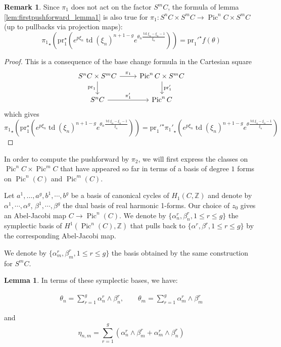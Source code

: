\documentclass{article}
\theoremstyle{definition}
\newcounter{sharedcounter}[section]
\newtheorem{lemma}[sharedcounter]{Lemma}
\newtheorem{remark}[sharedcounter]{Remark}
\DeclareMathOperator{\pic}{\text{Pic}}
\DeclareMathOperator{\td}{td}
\newcommand{\eqtag}[3][1]{
\begin{equation}
   \label{#3}
	\begin{alignedat}{#1}
	#2
	\end{alignedat}
\end{equation}
}
\renewcommand{\leq}{\leqslant}
\begin{document}
\begin{remark}
Since $\pi_1$ does not act on the factor $S^m C$, the formula of lemma \ref{lem:firstpushforward_lemma1} is also true for $\pi_1:S^nC \times S^m C \to \pic^n C \times S^m C$ (up to pullbacks via projection maps):
$${\pi_1}_\star \left( \text{pr}_1^\star \left(e^{p \xi_n}\td(\xi_n)^{n+1-g}  e^{\theta_n \frac{\td \xi_n -\xi_n-1}{\xi_n}} \right)\right)={\text{pr}_1'}^\star f(\theta)$$
\end{remark}

\begin{proof}
This is a consequence of the base change formula in the Cartesian square 
\[
\begin{tikzcd}
S^n C \times S^m C \arrow[r, "\pi_1"] \arrow[d, "\mathrm{pr}_1"'] & \operatorname{Pic}^n C \times S^m C \arrow[d, "\mathrm{pr}'_1"] \\
S^n C \arrow[r, "\pi_1'"] & \operatorname{Pic}^n C
\end{tikzcd}
\]
which gives ${\pi_1}_\star \left( \text{pr}_1^\star \left(e^{p \xi_n}\td(\xi_n)^{n+1-g}  e^{\theta_n \frac{\td \xi_n -\xi_n-1}{\xi_n}} \right)\right)={\text{pr}_1'}^\star {\pi_1'}_\star \left(e^{p \xi_n}\td(\xi_n)^{n+1-g}  e^{\theta \frac{\td \xi_n -\xi_n-1}{\xi_n}} \right)$

\end{proof}





In order to compute the pushforward by $\pi_2$, we will first express the classes on $\pic^{n} C \times \pic^{m}C$ that have appeared so far in terms of a basis of degree $1$ forms on $\pic^n(C)$ and $\pic^m(C)$.


Let $a^1,\dots,a^g, b^1,\cdots,b^g$ be a basis of canonical cycles of $H_1(C,\mathbb{Z})$ and denote by $\alpha^1,\cdots,\alpha^g$, $\beta^1, \cdots,\beta^g$ the dual basis of real harmonic 1-forms.  Our choice of $z_0$ gives an Abel-Jacobi map $C \longrightarrow \pic^{n}(C)$. We denote by $\lbrace \alpha_n^r,\beta_{n}^r,  1\leq r\leq g \rbrace$ the symplectic basis of $H^1(\pic^{n}(C),\mathbb{Z})$ that pulls back to $\{\alpha^r,\beta^r, 1\leq r \leq g\}$ by the corresponding Abel-Jacobi map. 

We denote by $\lbrace \alpha_m^r,\beta_{m}^r,  1\leq r\leq g \rbrace$ the basis obtained by the same construction for $S^m C$.


\begin{lemma}
\label{lem:etainsimplecticbasis}
In terms of these symplectic bases, we have:
    
\eqtag{
\theta_n=\sum_{r=1}^g \alpha_n^r \wedge \beta_n^r, \qquad \theta_m=\sum_{r=1}^g \alpha_m^r\wedge \beta_m^r}{eq:ThetaAsDifferentialForm}
and
\begin{equation}
    \eta_{n,m}=\sum_{r=1}^g (\alpha_n^r \wedge\beta_m^r +\alpha_m^r \wedge\beta_n^r)
\end{equation}

  
\end{lemma}
 
\end{document}
